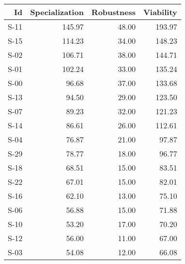 

\begin{tabular}{ | r | r | r | r | }
    \hline
                    Id  &  Specialization  &      Robustness  &       Viability  \\
    \hline
    \hline
                  S-11  &          145.97  &           48.00  &          193.97  \\
    \hline
                  S-15  &          114.23  &           34.00  &          148.23  \\
    \hline
                  S-02  &          106.71  &           38.00  &          144.71  \\
    \hline
                  S-01  &          102.24  &           33.00  &          135.24  \\
    \hline
                  S-00  &           96.68  &           37.00  &          133.68  \\
    \hline
                  S-13  &           94.50  &           29.00  &          123.50  \\
    \hline
                  S-07  &           89.23  &           32.00  &          121.23  \\
    \hline
                  S-14  &           86.61  &           26.00  &          112.61  \\
    \hline
                  S-04  &           76.87  &           21.00  &           97.87  \\
    \hline
                  S-29  &           78.77  &           18.00  &           96.77  \\
    \hline
                  S-18  &           68.51  &           15.00  &           83.51  \\
    \hline
                  S-22  &           67.01  &           15.00  &           82.01  \\
    \hline
                  S-16  &           62.10  &           13.00  &           75.10  \\
    \hline
                  S-06  &           56.88  &           15.00  &           71.88  \\
    \hline
                  S-10  &           53.20  &           17.00  &           70.20  \\
    \hline
                  S-12  &           56.00  &           11.00  &           67.00  \\
    \hline
                  S-03  &           54.08  &           12.00  &           66.08  \\

\end{tabular}
